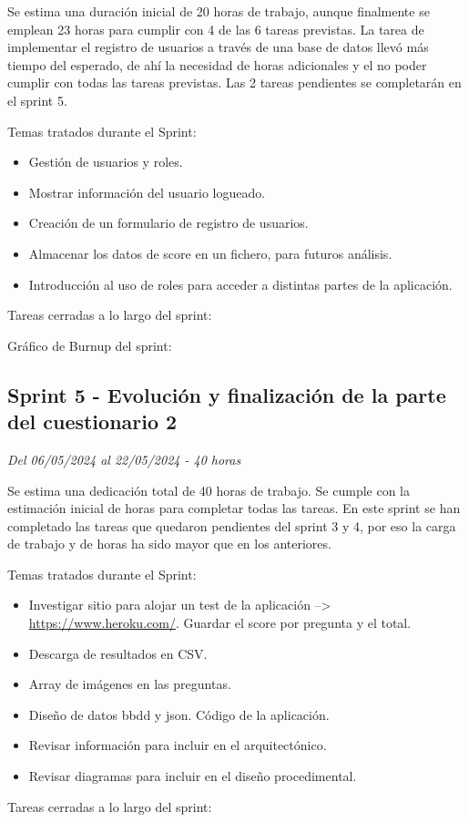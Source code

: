 Se estima una duración inicial de 20 horas de trabajo, aunque finalmente se emplean 23 horas para cumplir con 4 de las 6 tareas previstas.
La tarea de implementar el registro de usuarios a través de una base de datos llevó más tiempo del esperado, de ahí la necesidad de horas adicionales y el no poder cumplir con todas las tareas previstas.
Las 2 tareas pendientes se completarán en el sprint 5.

Temas tratados durante el Sprint:
\begin{itemize}
	\item
	Gestión de usuarios y roles.
	\item
	Mostrar información del usuario logueado.
	\item
	Creación de un formulario de registro de usuarios.
	\item
	Almacenar los datos de score en un fichero, para futuros análisis.
	\item
	Introducción al uso de roles para acceder a distintas partes de la aplicación.
\end{itemize}
\clearpage
Tareas cerradas a lo largo del sprint:

Gráfico de Burnup del sprint:


\clearpage
\subsection{Sprint 5 - Evolución y finalización de la parte del cuestionario 2}
\textit{Del 06/05/2024 al 22/05/2024 - 40 horas}

Se estima una dedicación total de 40 horas de trabajo.
Se cumple con la estimación inicial de horas para completar todas las tareas.
En este sprint se han completado las tareas que quedaron pendientes del sprint 3 y 4, por eso la carga de trabajo y de horas ha sido mayor que en los anteriores.

Temas tratados durante el Sprint:

\begin{itemize}
	\item
	Investigar sitio para alojar un test de la aplicación --> \url{https://www.heroku.com/}.
	Guardar el score por pregunta y el total.
	\item
	Descarga de resultados en CSV.
	\item
	Array de imágenes en las preguntas.
	\item
	Diseño de datos bbdd y json. Código de la aplicación.
	\item
	Revisar información para incluir en el arquitectónico.
	\item
	Revisar diagramas para incluir en el diseño procedimental.
\end{itemize}
\clearpage
Tareas cerradas a lo largo del sprint:

